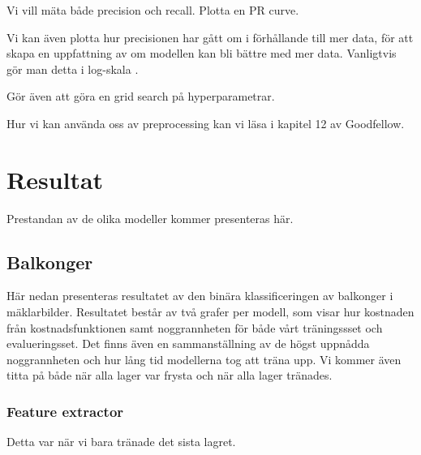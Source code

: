 \documentclass{kththesis}
\begin{document}
Vi vill mäta både precision och recall. Plotta en PR curve.

Vi kan även plotta hur precisionen har gått om i förhållande till mer data, för att skapa en uppfattning av om modellen kan bli bättre med mer data. Vanligtvis gör man detta i log-skala \parencite{Goodfellow-et-al-2016}. 

Gör även att göra en grid search på hyperparametrar.

Hur vi kan använda oss av preprocessing kan vi  läsa i kapitel 12 av Goodfellow.

\chapter{Resultat}
Prestandan av de olika modeller kommer presenteras här.

  \section{Balkonger}
  Här nedan presenteras resultatet av den binära klassificeringen av balkonger i mäklarbilder.
  Resultatet består av två grafer per modell, som visar hur kostnaden från kostnadsfunktionen samt noggrannheten för både vårt träningssset och evalueringsset.
  Det finns även en sammanställning av de högst uppnådda noggrannheten och hur lång tid modellerna tog att träna upp.
  Vi kommer även titta på både när alla lager var frysta och när alla lager tränades.

    \subsection{Feature extractor}
    Detta var när vi bara tränade det sista lagret.
\end{document}
